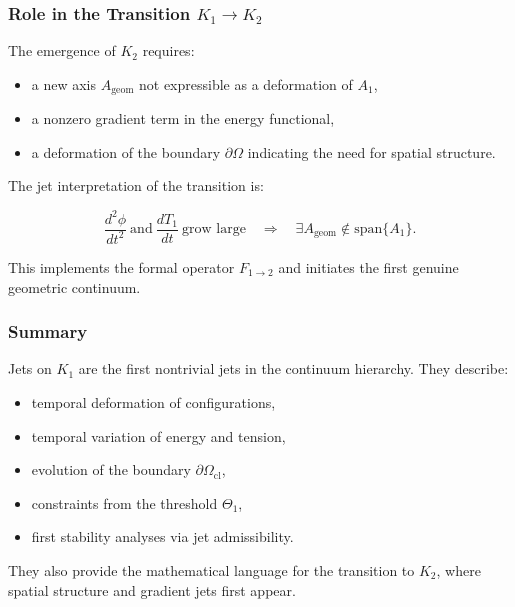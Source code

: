 \subsubsection{Role in the Transition \texorpdfstring{\texorpdfstring{$K_1\to K_2$}{K_1\to K_2}}{K1→K2}}

The emergence of $K_2$ requires:

\begin{itemize}
    \item a new axis $A_{\mathrm{geom}}$ not expressible as a
    deformation of $A_1$,
    \item a nonzero gradient term in the energy functional,
    \item a deformation of the boundary $\partial\Omega$ indicating the
    need for spatial structure.
\end{itemize}

The jet interpretation of the transition is:

\[
\frac{d^2\phi}{dt^2} \ \text{and}\
\frac{dT_1}{dt}\ \text{grow large}
\quad\Longrightarrow\quad
\exists A_{\mathrm{geom}}\notin \text{span}\{A_1\}.
\]

This implements the formal operator $F_{1\to2}$ and initiates the first
genuine geometric continuum.



\subsubsection{Summary}

Jets on $K_1$ are the first nontrivial jets in the continuum hierarchy.
They describe:

\begin{itemize}
    \item temporal deformation of configurations,
    \item temporal variation of energy and tension,
    \item evolution of the boundary $\partial\Omega_{\mathrm{cl}}$,
    \item constraints from the threshold $\Theta_1$,
    \item first stability analyses via jet admissibility.
\end{itemize}

They also provide the mathematical language for the transition to $K_2$,
where spatial structure and gradient jets first appear.
